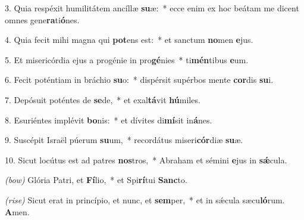 3. Quia respéxit humilitátem ancíllæ \textbf{su}æ:~* ecce enim ex hoc beátam me dicent omnes gene\textbf{ra}ti\textbf{ó}nes.

4. Quia fecit mihi magna qui \textbf{pot}ens est:~* et sanctum \textbf{no}men \textbf{e}jus.

5. Et misericórdia ejus a progénie in pro\textbf{gé}nies~* ti\textbf{mén}tibus \textbf{e}um.

6. Fecit poténtiam in bráchio \textbf{su}o:~* dispérsit supérbos mente \textbf{cor}dis \textbf{su}i.

7. Depósuit poténtes de \textbf{se}de,~* et exal\textbf{tá}vit \textbf{hú}miles.

8. Esuriéntes implévit \textbf{bo}nis:~* et dívites di\textbf{mí}sit in\textbf{á}nes.

9. Suscépit Israël púerum \textbf{su}um,~* recordátus miseri\textbf{cór}diæ \textbf{su}æ.

10. Sicut locútus est ad patres \textbf{nos}tros,~* Abraham et sémini \textbf{e}jus in \textbf{s\'{\ae}}cula.

\textit{(bow)} Glória Patri, et \textbf{Fí}lio,~* et Spi\textbf{rí}tui \textbf{Sanc}to.

\textit{(rise)} Sicut erat in princípio, et nunc, et \textbf{sem}per,~* et in s\'{\ae}cula sæcu\textbf{ló}rum. \textbf{A}men.